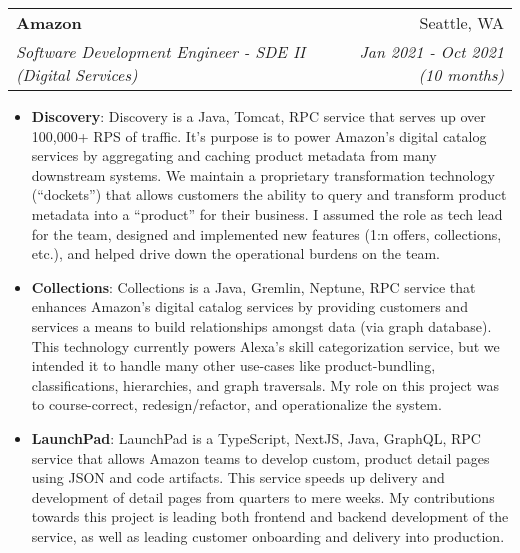\documentclass[letterpaper,11pt]{article}
\makeatletter
\newcommand{\resumeItem}[2]{
  \item\small{
    \textbf{#1}{: #2 \vspace{-2pt}}
  }
}
\newcommand{\resumeSubheading}[4]{
  \vspace{-1pt}\item
    \begin{tabular*}{0.97\textwidth}[t]{l@{\extracolsep{\fill}}r}
      \textbf{#1} & #2 \\
      \textit{\small#3} & \textit{\small #4} \\
    \end{tabular*}\vspace{-5pt}
}
\newcommand{\resumeItemListStart}{\begin{itemize}}
\newcommand{\resumeItemListEnd}{\end{itemize}\vspace{-5pt}}
\makeatother
\begin{document}
    \resumeSubheading
      {Amazon}{Seattle, WA}
      {Software Development Engineer - SDE II (Digital Services)}{Jan 2021 - Oct 2021 (10 months)}
      \resumeItemListStart
        \resumeItem{Discovery}
          {Discovery is a Java, Tomcat, RPC service that serves up over 100,000+ RPS of traffic. It's purpose is to power Amazon's digital catalog services by aggregating and caching product metadata from many downstream systems. We maintain a proprietary transformation technology (``dockets'') that allows customers the ability to query and transform product metadata into a ``product'' for their business. I assumed the role as tech lead for the team, designed and implemented new features (1:n offers, collections, etc.), and helped drive down the operational burdens on the team.}
        \resumeItem{Collections}
          {Collections is a Java, Gremlin, Neptune, RPC service that enhances Amazon's digital catalog services by providing customers and services a means to build relationships amongst data (via graph database). This technology currently powers Alexa's skill categorization service, but we intended it to handle many other use-cases like product-bundling, classifications, hierarchies, and graph traversals. My role on this project was to course-correct, redesign/refactor, and operationalize the system.}
        \resumeItem{LaunchPad}
          {LaunchPad is a TypeScript, NextJS, Java, GraphQL, RPC service that allows Amazon teams to develop custom, product detail pages using JSON and code artifacts. This service speeds up delivery and development of detail pages from quarters to mere weeks. My contributions towards this project is leading both frontend and backend development of the service, as well as leading customer onboarding and delivery into production.}
      \resumeItemListEnd
\end{document}
